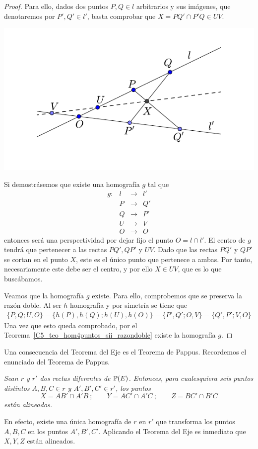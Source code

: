 \begin{proof}
	Para ello, dados dos puntos $P,Q\in l$ arbitrarios y sus imágenes, que denotaremos por $P',Q'\in l'$, basta comprobar que $X=PQ'\cap P'Q\in UV$.
	\begin{center}
		\includegraphics[scale=.9]{Graficos/TeoremaDelEje/TeoremaDelEjeCaso2}
	\end{center}
	Si demostrásemos que existe una homografía $g$ tal que
	\[\begin{array}{cccc}
	g:&l&\rightarrow &l'\\
	&P&\rightarrow&Q'\\
	&Q&\rightarrow&P'\\
	&U&\rightarrow&V\\
	&O&\rightarrow&O
	\end{array}\]
	entonces será una perspectividad por dejar fijo el punto $O=l\cap l'$. El centro de $g$ tendrá que pertenecer a las rectas $PQ',QP'$ y $UV$. Dado que las rectas $PQ'$ y $QP'$ se cortan en el punto $X$, este es el único punto que pertenece a ambas. Por tanto, necesariamente este debe ser el centro, y por ello $X\in UV$, que es lo que buscábamos.
	
	Veamos que la homografía $g$ existe. Para ello, comprobemos que se preserva la razón doble. Al ser $h$ homografía y por simetría se tiene que
	\begin{multline}
		\{P,Q;U,O\}=\{h(P),h(Q);h(U),h(O)\}=\{P',Q';O,V\}=\{Q',P';V,O\}
	\end{multline}
	Una vez que esto queda comprobado, por el Teorema~\ref{C5_teo_hom4puntos_sii_razondoble} existe la homografía $g$.
\end{proof}

\begin{obs}
	Una consecuencia del Teorema del Eje es el Teorema de Pappus. Recordemos el enunciado del Teorema de Pappus.
	
	\textit{Sean $r$ y $r'$ dos rectas diferentes de $\mathbb{P}(E)$. Entonces, para cualesquiera seis puntos distintos $A,B,C\in r$ y $A',B',C'\in r'$, los puntos
	\begin{equation*}
		X=AB'\cap A'B \ ; \qquad Y=AC'\cap A'C \ ; \qquad Z=BC'\cap B'C
	\end{equation*}
	están alineados.}

	En efecto, existe una única homografía de $r$ en $r'$ que transforma los puntos $A,B,C$ en los puntos $A',B',C'$. Aplicando el Teorema del Eje es inmediato que $X,Y,Z$ están alineados.
\end{obs}

